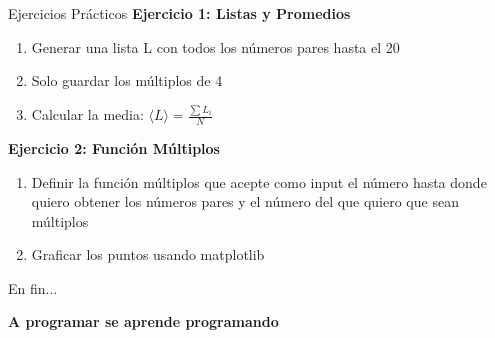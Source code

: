 \documentclass{beamer}
\begin{document}
\begin{frame}{Ejercicios Prácticos}
\textbf{Ejercicio 1: Listas y Promedios}
\begin{enumerate}
    \item Generar una lista L con todos los números pares hasta el 20
    \item Solo guardar los múltiplos de 4
    \item Calcular la media: $\langle L \rangle = \frac{\sum L_i}{N}$
\end{enumerate}

\textbf{Ejercicio 2: Función Múltiplos}
\begin{enumerate}
    \item Definir la función múltiplos que acepte como input el número hasta donde quiero obtener los números pares y el número del que quiero que sean múltiplos
    \item Graficar los puntos usando matplotlib
\end{enumerate}
\end{frame}

\begin{frame}{En fin...}
\begin{center}
\Huge\textbf{A programar se aprende programando}
\end{center}
\end{frame}
\end{document}
